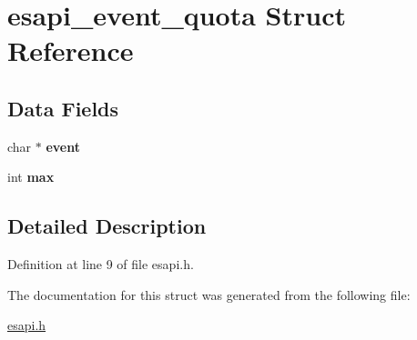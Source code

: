 \hypertarget{structesapi__event__quota}{
\section{esapi\_\-event\_\-quota Struct Reference}
\label{structesapi__event__quota}
}
\subsection*{Data Fields}
\begin{DoxyCompactItemize}
\item 
\hypertarget{structesapi__event__quota_a21b6ae58232f7eb8f885c9756b1d735d}{
char $\ast$ {\bfseries event}}
\label{structesapi__event__quota_a21b6ae58232f7eb8f885c9756b1d735d}

\item 
\hypertarget{structesapi__event__quota_ac9b9b42c73dbe7c4619f4433f3186a95}{
int {\bfseries max}}
\label{structesapi__event__quota_ac9b9b42c73dbe7c4619f4433f3186a95}

\end{DoxyCompactItemize}


\subsection{Detailed Description}


Definition at line 9 of file esapi.h.



The documentation for this struct was generated from the following file:\begin{DoxyCompactItemize}
\item 
\hyperlink{esapi_8h}{esapi.h}\end{DoxyCompactItemize}
